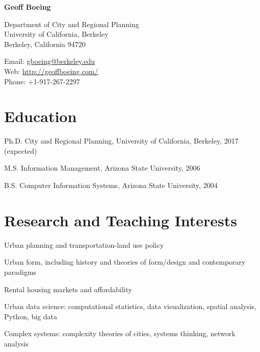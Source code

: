 \documentclass[12pt,letterpaper]{report}
\newcommand{\namefont}[1]{{\normalfont\bfseries\Huge{#1}}}
\newcommand{\listitemspace}{0.2em}
\renewenvironment{itemize}{
  \begin{list}{}{
      \setlength{\leftmargin}{0em}
      \setlength{\parskip}{0em}
      \setlength{\itemsep}{\listitemspace}
      \setlength{\parsep}{\listitemspace}
    }
}{
  \end{list}
}
\newcommand{\myname}{Geoff Boeing}
\begin{document}
\raggedright

\namefont{\myname}

\vspace{1em}
\begin{minipage}[t]{0.495\textwidth}
  Department of City and Regional Planning \\
  University of California, Berkeley \\
  Berkeley, California 94720
\end{minipage}
\begin{minipage}[t]{0.495\textwidth}
  Email: \href{mailto:gboeing@berkeley.edu}{gboeing@berkeley.edu} \\
  Web: \href{http://geoffboeing.com/}{http://geoffboeing.com/} \\
  Phone: +1-917-267-2297
\end{minipage}
\vspace{0.5em}



\section*{Education}

\begin{tablist}
\item[Ph.D.] \tab City and Regional Planning, University of California, Berkeley, 2017 (expected)
\item[M.S.]  \tab Information Management, Arizona State University, 2006
\item[B.S.]  \tab Computer Information Systems, Arizona State University, 2004
\end{tablist}



\section*{Research and Teaching Interests}

\begin{itemize}
\item Urban planning and transportation-land use policy
\item Urban form, including history and theories of form/design and contemporary paradigms
\item Rental housing markets and affordability
\item Urban data science: computational statistics, data visualization, spatial analysis, Python, big data
\item Complex systems: complexity theories of cities, systems thinking, network analysis
\end{itemize}
\end{document}
